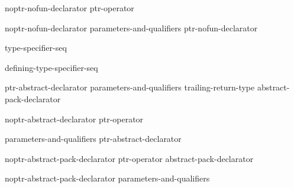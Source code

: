 \begin{bnf}
\br
    noptr-nofun-declarator\br
    ptr-operator 
\end{bnf}

\begin{bnf}
\br
    noptr-nofun-declarator parameters-and-qualifiers\br
     \terminal{[}  \terminal{]} \br
    \terminal{(} ptr-nofun-declarator \terminal{)}
\end{bnf}

\begin{bnf}
\br
    type-specifier-seq 
\end{bnf}

\begin{bnf}
\br
    defining-type-specifier-seq 
\end{bnf}

\begin{bnf}
\br
    ptr-abstract-declarator\br
     parameters-and-qualifiers trailing-return-type\br
    abstract-pack-declarator
\end{bnf}

\begin{bnf}
\br
    noptr-abstract-declarator\br
    ptr-operator 
\end{bnf}

\begin{bnf}
\br
     parameters-and-qualifiers\br
     \terminal{[}  \terminal{]} \br
    \terminal{(} ptr-abstract-declarator \terminal{)}
\end{bnf}

\begin{bnf}
\br
    noptr-abstract-pack-declarator\br
    ptr-operator abstract-pack-declarator
\end{bnf}

\begin{bnf}
\br
    noptr-abstract-pack-declarator parameters-and-qualifiers\br
\end{bnf}

